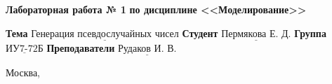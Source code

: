 \vspace{1cm}

\begin{center}
	\noindent\begin{minipage}{1.3\textwidth}\centering
		\Large\textbf{  Лабораторная работа № 1}\newline
		\textbf{по дисциплине <<Моделирование>>}\newline\newline
	\end{minipage}
\end{center}

\noindent\textbf{Тема} $\underline{\text{Генерация псевдослучайных чисел}}$\newline\newline
\noindent\textbf{Студент} $\underline{\text{Пермякова Е. Д.}}$\newline\newline
\noindent\textbf{Группа} $\underline{\text{ИУ7-72Б}}$\newline\newline
\noindent\textbf{Преподаватели} $\underline{\text{Рудаков И. В.}}$\newline

\begin{center}
	\vfill
	Москва,~\the\year
\end{center}
\clearpage
